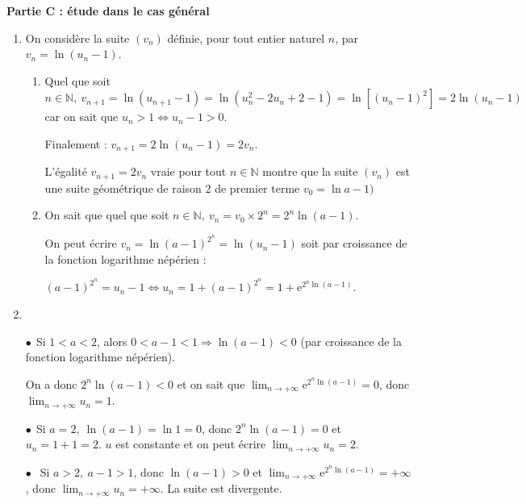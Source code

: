 \documentclass[10pt]{article}
\providecommand{\N}{\mathbb{N}}
\providecommand{\e}{{\mathrm{e}}}
\begin{document}
\bigskip

\textbf{Partie C : étude dans le cas général}

\medskip

\begin{enumerate}
\item On considère la suite $\left(v_n\right)$ définie, pour tout entier naturel $n$, par $v_n = \ln \left(u_n - 1\right)$.
	\begin{enumerate}
		\item 
Quel que soit $n \in \N, \: v_{n+1} = \ln \left(u_{n+1} - 1\right) = \ln \left(u_n^2 - 2u_n + 2 - 1\right) = \ln \left[\left(u_n - 1\right)^2\right] = 2\ln \left(u_n - 1\right)$ car on sait que $u_n > 1 \iff u_n - 1 > 0$.

Finalement : $v_{n+1} = 2\ln \left(u_n - 1\right) = 2v_n$.

L'égalité $v_{n+1} = 2v_n$ vraie pour tout $n \in \N$ montre que la suite $\left(v_n\right)$ est une suite géométrique de raison 2 de premier terme $v_0 = \ln a - 1)$
		\item 
On sait que quel que soit $n \in \N, \: v_n = v_0 \times 2^n = 2^n\ln (a - 1)$.

On peut écrire  $v_n = \ln (a - 1)^{2^n} = \ln \left(u_n - 1\right)$ soit par croissance de la fonction logarithme népérien :

$(a - 1)^{2^n} = u_n - 1 \iff u_n = 1 + (a - 1)^{2^n} = 1 + \e^{2^n \ln (a - 1)}$.
	\end{enumerate}
\item ~

$\bullet~~$Si $1 < a < 2$, alors $0 < a - 1 < 1 \Rightarrow \ln (a - 1) < 0$ (par croissance de la fonction logarithme népérien).

On a donc $2^n \ln (a - 1) < 0$ et on sait que $\displaystyle\lim_{n \to + \infty} \e^{2^n \ln (a - 1)} = 0$, donc $\displaystyle\lim_{n \to + \infty}u_n = 1$.

$\bullet~~$Si $a = 2, \: \ln (a - 1) = \ln 1 = 0$, donc $2^n \ln (a - 1) = 0$ et $u_n = 1 + 1 = 2$. $u$ est constante et on peut écrire $\displaystyle\lim_{n \to + \infty}u_n = 2$.

$\bullet~~$ Si $a > 2, \: a - 1 > 1$, donc $\ln (a - 1) > 0$ et $\displaystyle\lim_{n \to + \infty} \e^{2^n \ln (a - 1)} = + \infty$, donc $\displaystyle\lim_{n \to + \infty}u_n = + \infty$. La suite est divergente.
\end{enumerate}

\bigskip
\end{document}
